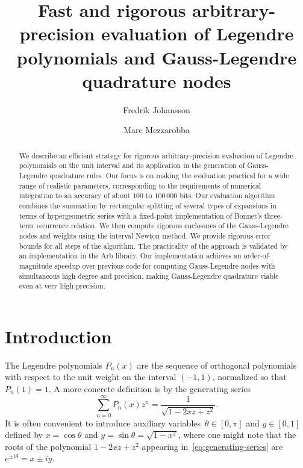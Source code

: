 \documentclass[11pt,a4paper]{article}
\begin{document}
\title{Fast and rigorous arbitrary-precision evaluation of Legendre
polynomials and Gauss-Legendre quadrature nodes}
\author{Fredrik Johansson \and Marc Mezzarobba}
\date{}
\maketitle

\begin{abstract}
We describe an efficient strategy for rigorous
arbitrary-precision evaluation of Legendre polynomials on the unit
interval and its application in the generation of Gauss-Legendre
quadrature rules.
Our focus is on making the evaluation practical for a wide range of
realistic parameters, corresponding to the requirements of numerical
integration to an accuracy of about $100$ to $100\,000$ bits.
Our evaluation algorithm combines the summation by rectangular
splitting of several types of expansions in terms of hypergeometric
series with a fixed-point implementation of Bonnet's three-term
recurrence relation.
We then compute rigorous enclosures of the Gauss-Legendre nodes and
weights using the interval Newton method.
We provide rigorous error bounds for all steps of the algorithm.
The practicality of the approach is validated by an implementation in
the Arb library.
Our implementation achieves an order-of-magnitude speedup over
previous code for computing Gauss-Legendre nodes with simultaneous
high degree and precision, making Gauss-Legendre quadrature viable
even at very high precision.
\end{abstract}

\section{Introduction}

The Legendre polynomials $P_n(x)$ are the sequence
of orthogonal polynomials with respect to the unit weight
on the interval $(-1,1)$, normalized so that $P_n(1) = 1$.
A more concrete definition is by the generating series
\begin{equation} \label{eq:generating-series}
  \sum_{n=0}^{\infty} P_n(x) z^n
  = \frac{1}{\sqrt{1 - 2 x z + z^2}}.
\end{equation}
It is often convenient to introduce auxiliary
variables~$\theta \in [0, \pi]$ and $y \in [0, 1]$ defined by
$x = \cos \theta$ and $y = \sin \theta = \sqrt{1 - x^2}$,
where one might note that the roots of the polynomial $1 - 2 x z + z^2$ appearing
in \eqref{eq:generating-series} are $e^{\pm i \theta} = x \pm i y$.
\end{document}
